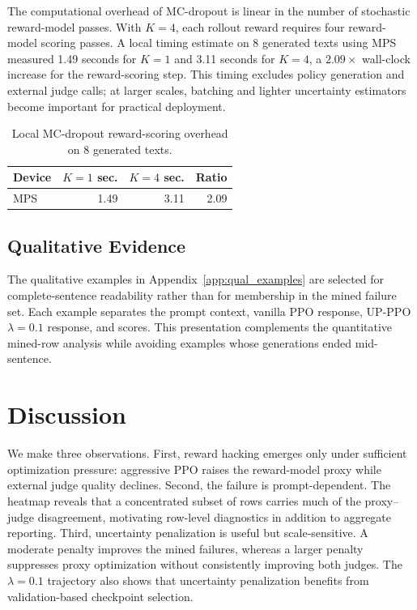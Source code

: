 \documentclass[11pt]{article}
\begin{document}
The computational overhead of MC-dropout is linear in the number of stochastic reward-model passes. With $K=4$, each rollout reward requires four reward-model scoring passes. A local timing estimate on 8 generated texts using MPS measured 1.49 seconds for $K=1$ and 3.11 seconds for $K=4$, a $2.09\times$ wall-clock increase for the reward-scoring step. This timing excludes policy generation and external judge calls; at larger scales, batching and lighter uncertainty estimators become important for practical deployment.

\begin{table}[!tbp]
\centering
\scriptsize
\caption{Local MC-dropout reward-scoring overhead on 8 generated texts.}
\label{tab:mc_overhead}
\begin{tabular}{lrrr}
\toprule
Device & $K=1$ sec. & $K=4$ sec. & Ratio \\
\midrule
MPS & 1.49 & 3.11 & 2.09 \\
\bottomrule
\end{tabular}
\end{table}

\subsection{Qualitative Evidence}
The qualitative examples in Appendix~\ref{app:qual_examples} are selected for complete-sentence readability rather than for membership in the mined failure set. Each example separates the prompt context, vanilla PPO response, UP-PPO $\lambda=0.1$ response, and scores. This presentation complements the quantitative mined-row analysis while avoiding examples whose generations ended mid-sentence.


\section{Discussion}
We make three observations. First, reward hacking emerges only under sufficient optimization pressure: aggressive PPO raises the reward-model proxy while external judge quality declines. Second, the failure is prompt-dependent. The heatmap reveals that a concentrated subset of rows carries much of the proxy--judge disagreement, motivating row-level diagnostics in addition to aggregate reporting. Third, uncertainty penalization is useful but scale-sensitive. A moderate penalty improves the mined failures, whereas a larger penalty suppresses proxy optimization without consistently improving both judges. The $\lambda=0.1$ trajectory also shows that uncertainty penalization benefits from validation-based checkpoint selection.
\end{document}
